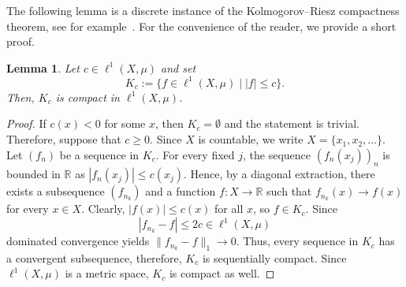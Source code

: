 \documentclass[letterpaper]{article}
\newtheorem{lemma}{Lemma}[section]
\theoremstyle{definition}
\theoremstyle{named}
\numberwithin{equation}{section}
\begin{document}
The following lemma is a discrete instance of the Kolmogorov–Riesz compactness theorem, see for example~\cite[Theorem 4]{hanche2010kolmogorov}. For the convenience of the reader, we provide a short proof.
\begin{lemma}\label{lem:sequentially-compact}
Let $c\in \ell^1(X,\mu)$ and set
\[
K_c:=\{f\in \ell^1(X,\mu) \mid |f|\leq c\}.
\]
Then, $K_c$ is compact in $\ell^1(X,\mu)$.
\end{lemma}

\begin{proof}
If $c(x)<0$ for some $x$, then $K_c = \emptyset$ and the statement is trivial. Therefore, suppose that $c\geq 0$. Since $X$ is countable, we write $X=\{x_1,x_2,\dots\}$. Let $(f_n)$ be a sequence in $K_c$. For every fixed $j$, the sequence $(f_n(x_j))_n$ is bounded in $\mathbb R$ as $|f_n(x_j)|\leq c(x_j)$. Hence, by a diagonal extraction, there exists a subsequence $(f_{n_k})$ and a function $f\colon X\to\mathbb R$ such that $f_{n_k}(x)\to f(x)$ for every $x\in X$. Clearly, $|f(x)|\leq c(x)$ for all $x$, so $f\in K_c$. Since
\[
|f_{n_k}-f|\leq 2c\in \ell^1(X,\mu)
\]
dominated convergence yields $\|f_{n_k}-f\|_1\to 0$. Thus, every sequence in $K_c$ has a convergent subsequence, therefore, 
$K_c$ is sequentially compact. Since $\ell^1(X,\mu)$ is a metric space, $K_c$ is compact as well.
\end{proof}
\end{document}
